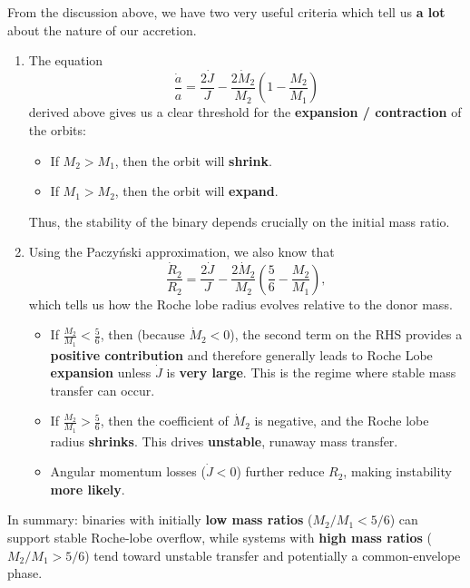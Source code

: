 \begin{bigidea}
    From the discussion above, we have two very useful criteria which tell us \textbf{a lot} about the nature of our accretion.
    \begin{enumerate}
        \item The equation
            \[ 
            \frac{\dot{a}}{a} = \frac{2\dot{J}}{J} - \frac{2 \dot{M}_2}{M_2} \left(1-\frac{M_2}{M_1}\right)
            \]
            derived above gives us a clear threshold for the \textbf{expansion / contraction} of the orbits:
            \begin{itemize}
                \item If $M_2>M_1$, then the orbit will \textbf{shrink}.
                \item If $M_1 > M_2$, then the orbit will \textbf{expand}.
            \end{itemize}
            Thus, the stability of the binary depends crucially on the initial mass ratio.
        \item Using the Paczyński approximation, we also know that 
        \[
        \frac{\dot{R}_2}{R_2} = \frac{2\dot{J}}{J} - \frac{2\dot{M}_2}{M_2}\left(\frac{5}{6}-\frac{M_2}{M_1}\right),
        \]
        which tells us how the Roche lobe radius evolves relative to the donor mass. 
        \begin{itemize}
            \item If $\frac{M_2}{M_1} < \tfrac{5}{6}$, then (because $\dot{M}_2 < 0$), the second term on the RHS provides a \textbf{positive contribution} and therefore generally leads to Roche Lobe \textbf{expansion} unless $\dot{J}$ is \textbf{very large}. This is the regime where stable mass transfer can occur.
            \item If $\frac{M_2}{M_1} > \tfrac{5}{6}$, then the coefficient of $\dot{M}_2$ is negative, and the Roche lobe radius \textbf{shrinks}. This drives \textbf{unstable}, runaway mass transfer.
            \item Angular momentum losses ($\dot{J}<0$) further reduce $R_2$, making instability \textbf{more likely}.
        \end{itemize}
    \end{enumerate}
    In summary: binaries with initially \textbf{low mass ratios} ($M_2/M_1 < 5/6$) can support stable Roche-lobe overflow, while systems with \textbf{high mass ratios} ($M_2/M_1 > 5/6$) tend toward unstable transfer and potentially a common-envelope phase.
\end{bigidea}

